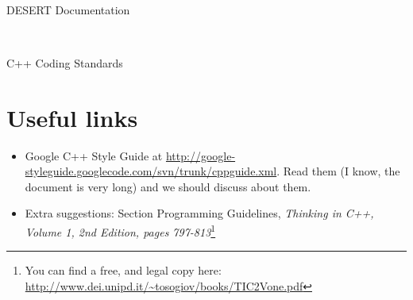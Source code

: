 \documentclass[12pt]{article}
\begin{document}
\begin{Large} \\ \end{Large}
\begin{large} {DESERT Documentation} \end{large}\\
\begin{large} {C++ Coding Standards} \end{large}

\vspace{0.8cm}

\section*{Useful links}
\begin{itemize}
	\item Google C++ Style Guide at \url{http://google-styleguide.googlecode.com/svn/trunk/cppguide.xml}. Read them (I know, the document is very long) and we should discuss about them.
	\item Extra suggestions: Section Programming Guidelines, \emph{Thinking in C++, Volume 1, 2nd Edition, pages 797-813}\footnote{You can find a free, and legal copy here: \url{http://www.dei.unipd.it/~tosogiov/books/TIC2Vone.pdf}}
\end{itemize}
\end{document}
